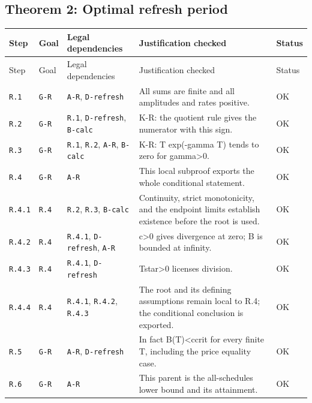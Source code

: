 \documentclass[11pt,letterpaper]{article}
\begin{document}
{\subsection{Theorem 2: Optimal refresh period}
\begin{longtable}{>{\raggedright\arraybackslash}p{.10\linewidth}>{\raggedright\arraybackslash}p{.08\linewidth}>{\raggedright\arraybackslash}p{.19\linewidth}>{\raggedright\arraybackslash}p{.46\linewidth}>{\raggedright\arraybackslash}p{.08\linewidth}}
\toprule
Step & Goal & Legal dependencies & Justification checked & Status \\
\midrule\endfirsthead
\toprule
Step & Goal & Legal dependencies & Justification checked & Status \\
\midrule\endhead
\bottomrule\endfoot
\texttt{R.1} & \texttt{G-R} & \texttt{A-R}, \texttt{D-refresh} & All sums are finite and all amplitudes and rates positive. & OK \\[3pt]
\texttt{R.2} & \texttt{G-R} & \texttt{R.1}, \texttt{D-refresh}, \texttt{B-calc} & K-R: the quotient rule gives the numerator with this sign. & OK \\[3pt]
\texttt{R.3} & \texttt{G-R} & \texttt{R.1}, \texttt{R.2}, \texttt{A-R}, \texttt{B-calc} & K-R: T exp(-gamma T) tends to zero for gamma>0. & OK \\[3pt]
\texttt{R.4} & \texttt{G-R} & \texttt{A-R} & This local subproof exports the whole conditional statement. & OK \\[3pt]
\texttt{R.4.1} & \texttt{R.4} & \texttt{R.2}, \texttt{R.3}, \texttt{B-calc} & Continuity, strict monotonicity, and the endpoint limits establish existence before the root is used. & OK \\[3pt]
\texttt{R.4.2} & \texttt{R.4} & \texttt{R.4.1}, \texttt{D-refresh}, \texttt{A-R} & c>0 gives divergence at zero; B is bounded at infinity. & OK \\[3pt]
\texttt{R.4.3} & \texttt{R.4} & \texttt{R.4.1}, \texttt{D-refresh} & Tstar>0 licenses division. & OK \\[3pt]
\texttt{R.4.4} & \texttt{R.4} & \texttt{R.4.1}, \texttt{R.4.2}, \texttt{R.4.3} & The root and its defining assumptions remain local to R.4; the conditional conclusion is exported. & OK \\[3pt]
\texttt{R.5} & \texttt{G-R} & \texttt{A-R}, \texttt{D-refresh} & In fact B(T)<ccrit for every finite T, including the price equality case. & OK \\[3pt]
\texttt{R.6} & \texttt{G-R} & \texttt{A-R} & This parent is the all-schedules lower bound and its attainment. & OK \\[3pt]

\end{longtable}}
\end{document}
